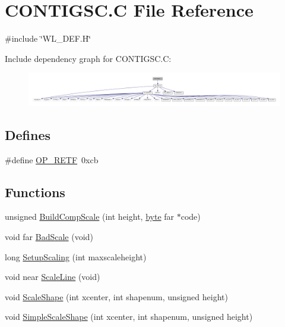 \hypertarget{CONTIGSC_8C}{
\section{CONTIGSC.C File Reference}
\label{CONTIGSC_8C}
}
{\ttfamily \#include \char`\"{}WL\_\-DEF.H\char`\"{}}\par
Include dependency graph for CONTIGSC.C:
\nopagebreak
\begin{figure}[H]
\begin{center}
\leavevmode
\includegraphics[width=400pt]{CONTIGSC_8C__incl}
\end{center}
\end{figure}
\subsection*{Defines}
\begin{DoxyCompactItemize}
\item 
\#define \hyperlink{CONTIGSC_8C_ac074f674fb85687a1a619fffb702967b}{OP\_\-RETF}~0xcb
\end{DoxyCompactItemize}
\subsection*{Functions}
\begin{DoxyCompactItemize}
\item 
unsigned \hyperlink{CONTIGSC_8C_a26b6d656e36ed0bff277b79c96ba9993}{BuildCompScale} (int height, \hyperlink{ID__HEAD_8H_a0c8186d9b9b7880309c27230bbb5e69d}{byte} far $\ast$code)
\item 
void far \hyperlink{CONTIGSC_8C_a1d7dcb4682fb94ac602a78018af0b729}{BadScale} (void)
\item 
long \hyperlink{CONTIGSC_8C_aaba41b509b2c39129abfed4d8e0e4255}{SetupScaling} (int maxscaleheight)
\item 
void near \hyperlink{CONTIGSC_8C_a9880cdbf8e6e563356f0c5e27b038136}{ScaleLine} (void)
\item 
void \hyperlink{CONTIGSC_8C_ac4e07b4cd66c3fa71e9f675325f5e8ca}{ScaleShape} (int xcenter, int shapenum, unsigned height)
\item 
void \hyperlink{CONTIGSC_8C_a11d04052928f61aec9102f6cce71fadb}{SimpleScaleShape} (int xcenter, int shapenum, unsigned height)
\end{DoxyCompactItemize}
